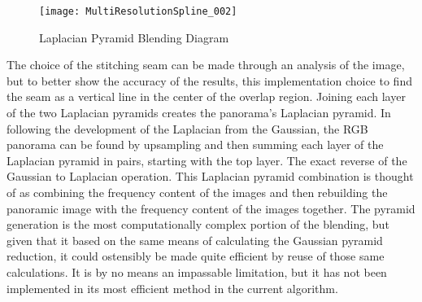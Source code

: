 \begin{figure}[h]
\centering
\texttt{[image: MultiResolutionSpline\_002]}
\caption{Laplacian Pyramid Blending Diagram}
\label{laplacianBlend}
\end{figure}

The choice of the stitching seam can be made through an analysis of the image, but to better show the accuracy of the results, this implementation choice to find the seam as a vertical line in the center of the overlap region. Joining each layer of the two Laplacian pyramids creates the panorama's Laplacian pyramid. In following the development of the Laplacian from the Gaussian, the RGB panorama can be found by upsampling and then summing each layer of the Laplacian pyramid in pairs, starting with the top layer. The exact reverse of the Gaussian to Laplacian operation. This Laplacian pyramid combination is thought of as combining the frequency content of the images and then rebuilding the panoramic image with the frequency content of the images together. The pyramid generation is the most computationally complex portion of the blending, but given that it based on the same means of calculating the Gaussian pyramid reduction, it could ostensibly be made quite efficient by reuse of those same calculations. It is by no means an impassable limitation, but it has not been implemented in its most efficient method in the current algorithm.




